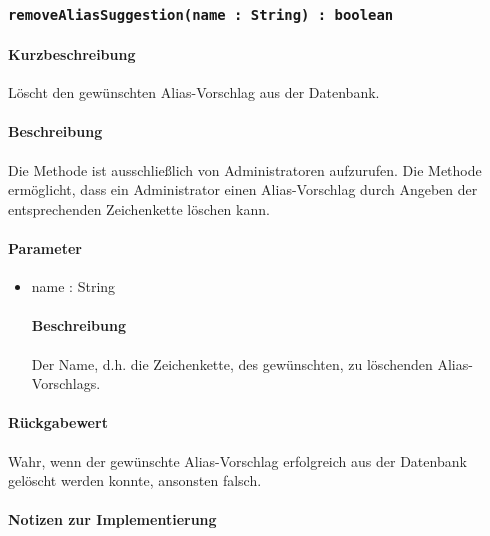 \subsubsection{\texttt{removeAliasSuggestion(name : String) : boolean}}%
\paragraph*{Kurzbeschreibung}
Löscht den gewünschten Alias-Vorschlag aus der Datenbank.
\paragraph*{Beschreibung}
Die Methode ist ausschließlich von Administratoren aufzurufen.
Die Methode ermöglicht, dass ein Administrator einen Alias-Vorschlag durch Angeben der entsprechenden Zeichenkette löschen kann.
\paragraph*{Parameter}
\begin{itemize}
	\item name : String
		\paragraph*{Beschreibung}
		Der Name, d.h. die Zeichenkette, des gewünschten, zu löschenden Alias-Vorschlags.
\end{itemize}
\paragraph*{Rückgabewert}
Wahr, wenn der gewünschte Alias-Vorschlag erfolgreich aus der Datenbank gelöscht werden konnte, ansonsten falsch.

\paragraph*{Notizen zur Implementierung}%
